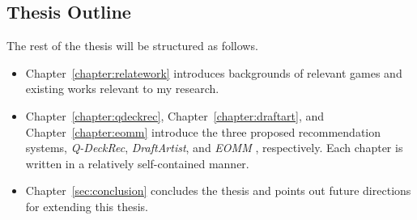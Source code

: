 \subsection{Thesis Outline}
The rest of the thesis will be structured as follows. 
\begin{itemize}
\item Chapter~\ref{chapter:relatework} introduces backgrounds of relevant games and existing works relevant to my research. 
\item Chapter~\ref{chapter:qdeckrec}, Chapter~\ref{chapter:draftart}, and Chapter~\ref{chapter:eomm} introduce the three proposed recommendation systems, \textit{Q-DeckRec}, \textit{DraftArtist}, and \textit{EOMM} , respectively. Each chapter is written in a relatively self-contained manner.
\item Chapter~\ref{sec:conclusion} concludes the thesis and points out future directions for extending this thesis.
\end{itemize}








